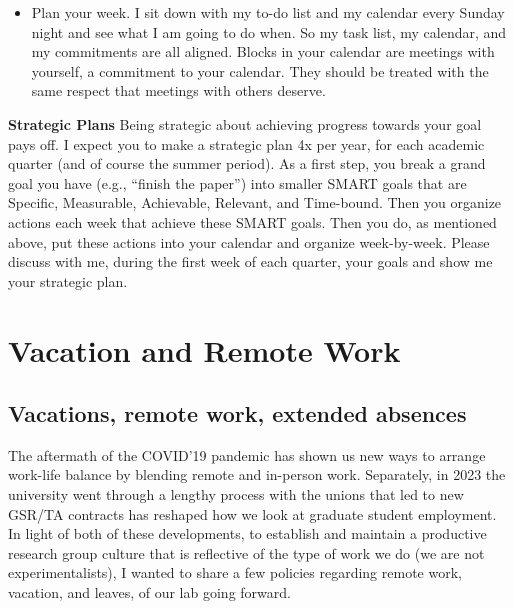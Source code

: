 \documentclass[12pt]{article}
\begin{document}
\begin{itemize}
        Gmail allows you to do that.
        Then I set a due date a week before the deadline.
        That way, I have some flexibility in case something unforeseen comes up and I do not make excuses.
  \item Plan your week.
        I sit down with my to-do list and my calendar every Sunday night and see what I am going to do when.
        So my task list, my calendar, and my commitments are all aligned.
        Blocks in your calendar are meetings with yourself, a commitment to your calendar.
        They should be treated with the same respect that meetings with others deserve.
\end{itemize}

\textbf{Strategic Plans}
Being strategic about achieving progress towards your goal pays off.
I expect you to make a strategic plan 4x per year, for each academic quarter (and of course the summer period).
As a first step, you break a grand goal you have (e.g., ``finish the paper'') into smaller SMART goals that are Specific, Measurable, Achievable, Relevant, and Time-bound.
Then you organize actions each week that achieve these SMART goals.
Then you do, as mentioned above, put these actions into your calendar and organize week-by-week.
Please discuss with me, during the first week of each quarter, your goals and show me your strategic plan.

\section{Vacation and Remote Work}

\subsection{Vacations, remote work, extended absences}

The aftermath of the COVID'19 pandemic has shown us new ways to arrange work-life balance by blending remote and in-person work.
Separately, in 2023 the university went through a lengthy process with the unions that led to new GSR/TA contracts has reshaped how we look at graduate student employment.
In light of both of these developments, to establish and maintain a productive research group culture that is reflective of the type of work we do (we are not experimentalists), I wanted to share a few policies regarding remote work, vacation, and leaves, of our lab going forward.
\end{document}
